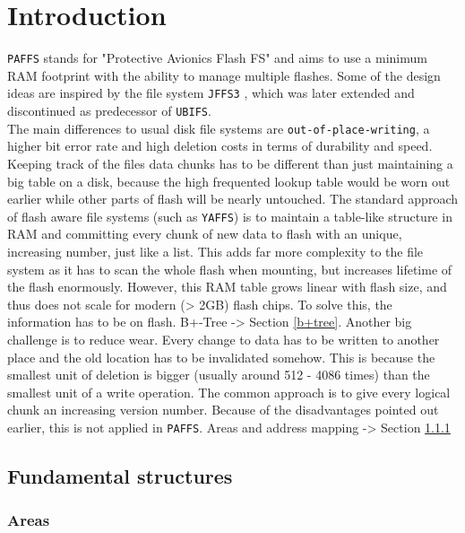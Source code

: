 \chapter{Introduction}
\label{cha:introduction}

\texttt{PAFFS} stands for "Protective Avionics Flash FS" and aims to use a minimum RAM footprint with the ability to manage multiple flashes. Some of the design ideas are inspired by the file system \texttt{JFFS3} , which was later extended  and discontinued as predecessor of \texttt{UBIFS}.\\
The main differences to usual disk file systems are \texttt{out-of-place-writing}, a higher bit error rate and high deletion costs in terms of durability and speed. Keeping track of the files data chunks has to be different than just maintaining a big table on a disk, because the high frequented lookup table would be worn out earlier while other parts of flash will be nearly untouched. The standard approach of flash aware file systems (such as \texttt{YAFFS}) is to maintain a table-like structure in RAM and committing every chunk of new data to flash with an unique, increasing number, just like a list. This adds far more complexity to the file system as it has to scan the whole flash when mounting, but increases lifetime of the flash enormously. However, this RAM table grows linear with flash size, and thus does not scale for modern (> 2GB) flash chips. To solve this, the information has to be on flash. B+-Tree -> Section \ref{b+tree}.
Another big challenge is to reduce wear. Every change to data has to be written to another place and the old location has to be invalidated somehow. This is because the smallest unit of deletion is bigger (usually around 512 - 4086 times) than the smallest unit of a write operation. The common approach is to give every logical chunk an increasing version number. Because of the disadvantages pointed out earlier, this is not applied in \texttt{PAFFS}. Areas and address mapping -> Section \ref{areas}

\section{Fundamental structures}
\label{sec:funst}

\subsection{Areas}
\label{areas}
